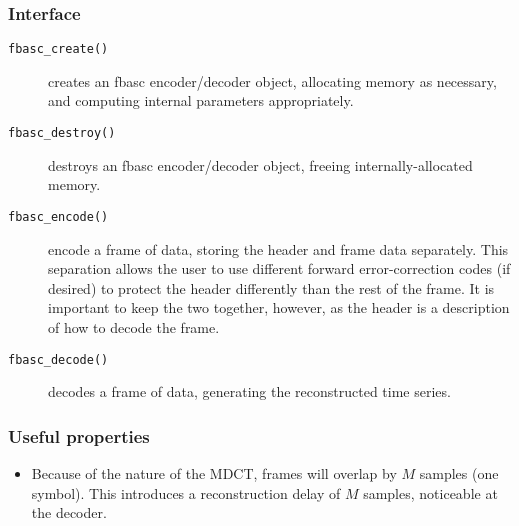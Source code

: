 \subsubsection{Interface}
\begin{description}
\item[{\tt fbasc\_create()}]
        creates an fbasc encoder/decoder object, allocating memory as
        necessary, and computing internal parameters appropriately.
\item[{\tt fbasc\_destroy()}]
        destroys an fbasc encoder/decoder object, freeing internally-allocated
        memory.
\item[{\tt fbasc\_encode()}]
        encode a frame of data, storing the header and frame data separately.
        This separation allows the user to use different forward
        error-correction codes (if desired) to protect the header differently
        than the rest of the frame.  It is important to keep the two together,
        however, as the header is a description of how to decode the frame.
\item[{\tt fbasc\_decode()}]
        decodes a frame of data, generating the reconstructed time series.
\end{description}

\subsubsection{Useful properties}
\begin{itemize}
\item Because of the nature of the MDCT, frames will overlap by $M$ samples
      (one symbol).  This introduces a reconstruction delay of $M$ samples,
      noticeable at the decoder.
\end{itemize}

%
%
%
%

